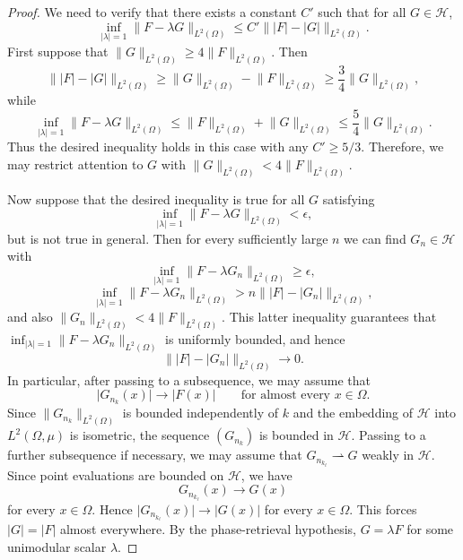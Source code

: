 \documentclass[11pt]{amsart}
\theoremstyle{remark}
\begin{document}
\begin{proof}
We need to verify that there exists a constant \(C'\) such that for all
\(G\in \mathcal{H}\),
\[
\inf_{\lvert \lambda \rvert=1}\lVert F-\lambda G \rVert_{L^2(\Omega)}
\le
C'\lVert \lvert F \rvert-\lvert G \rvert \rVert_{L^2(\Omega)}.
\]
First suppose that \(\lVert G \rVert_{L^2(\Omega)}\ge4\lVert F \rVert_{L^2(\Omega)}\).
Then
\[
\lVert \lvert F \rvert-\lvert G \rvert \rVert_{L^2(\Omega)}
\ge
\lVert G \rVert_{L^2(\Omega)}-\lVert F \rVert_{L^2(\Omega)}
\ge
\frac34\lVert G \rVert_{L^2(\Omega)},
\]
while
\[
\inf_{\lvert \lambda \rvert=1}\lVert F-\lambda G \rVert_{L^2(\Omega)}
\le
\lVert F \rVert_{L^2(\Omega)}+\lVert G \rVert_{L^2(\Omega)}
\le
\frac54\lVert G \rVert_{L^2(\Omega)}.
\]
Thus the desired inequality holds in this case with any \(C'\ge5/3\).
Therefore, we may restrict attention to \(G\) with
\(\lVert G \rVert_{L^2(\Omega)}<4\lVert F \rVert_{L^2(\Omega)}\).
\medskip


Now suppose that the desired inequality is true for all \(G\) satisfying
\[
\inf_{\lvert \lambda \rvert=1}\lVert F-\lambda G \rVert_{L^2(\Omega)}<\epsilon,
\]
but is not true in general. Then for every sufficiently large \(n\) we can find \(G_n\in \mathcal{H}\)
with
\[
\inf_{\lvert \lambda \rvert=1}\lVert F-\lambda G_n \rVert_{L^2(\Omega)}\ge\epsilon,
\]
\[
\inf_{\lvert \lambda \rvert=1}\lVert F-\lambda G_n \rVert_{L^2(\Omega)}
>
n\lVert \lvert F \rvert-\lvert G_n \rvert \rVert_{L^2(\Omega)},
\]
and also \(\lVert G_n \rVert_{L^2(\Omega)}<4\lVert F \rVert_{L^2(\Omega)}\). This latter
inequality guarantees that
\(\inf_{\lvert \lambda \rvert=1}\lVert F-\lambda G_n \rVert_{L^2(\Omega)}\) is uniformly
bounded, and hence
\[
\lVert \lvert F \rvert-\lvert G_n \rvert \rVert_{L^2(\Omega)}\to0.
\]
In particular, after passing to a subsequence, we may assume that
\[
\lvert G_{n_k}(x) \rvert\to\lvert F(x) \rvert
\qquad\text{for almost every }x\in\Omega.
\]
Since \(\lVert G_{n_k} \rVert_{L^2(\Omega)}\) is bounded independently of \(k\) and
the embedding of \(\mathcal{H}\) into \(L^2(\Omega,\mu)\) is isometric, the sequence
\((G_{n_k})\) is bounded in \(\mathcal{H}\). Passing to a further subsequence if
necessary, we may assume that \(G_{n_{k_\ell}}\rightharpoonup G\) weakly in
\(\mathcal{H}\). Since point evaluations are bounded on \(\mathcal{H}\), we have
\[
G_{n_{k_\ell}}(x)\to G(x)
\]
for every \(x\in\Omega\). Hence \(\lvert G_{n_{k_\ell}}(x) \rvert\to\lvert G(x) \rvert\) for
every \(x\in\Omega\). This forces \(\lvert G \rvert=\lvert F \rvert\) almost everywhere. By the
phase-retrieval hypothesis, \(G=\lambda F\) for some unimodular scalar \(\lambda\).
\medskip


\end{proof}
\end{document}
